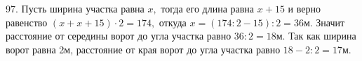97. Пусть ширина участка равна $x,$ тогда его длина равна $x+15$ и верно равенство $(x+x+15)\cdot2=174,$ откуда $x=(174:2-15):2=36\text{м}.$ Значит расстояние от середины ворот до угла участка равно $36:2=18\text{м}.$ Так как ширина ворот равна 2м, расстояние от края ворот до угла участка равно $18-2:2=17\text{м}.$\\
